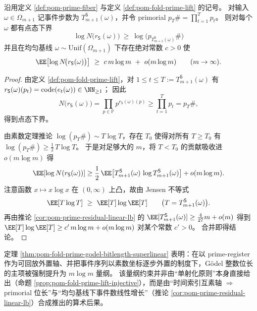 \begin{theorem}\label{thm:pom-fold-prime-godel-bitlength-superlinear}
沿用定义 \ref{def:pom-prime-fiber} 与定义 \ref{def:pom-fold-prime-lift} 的记号。
对输入 \(\omega\in\Omega_{m+1}\) 记事件步数为 \(T_{m+1}^{\mathsf S}(\omega)\)，并令 primorial \(p_T\#=\prod_{t=1}^{T}p_t\)。
则对每个 \(\omega\) 都有点态下界
\[
\boxed{\;
\log N\!\bigl(r_{\mathsf S}(\omega)\bigr)\ \ge\ \log\!\bigl(p_{T_{m+1}^{\mathsf S}(\omega)}\#\bigr)\;}
\]
并且在均匀基线 \(\omega\sim\mathrm{Unif}(\Omega_{m+1})\) 下存在绝对常数 \(c>0\) 使
\[
\EE\!\left[\log N\!\bigl(r_{\mathsf S}(\omega)\bigr)\right]
\ \ge\
c\,m\log m\ +\ o(m\log m)
\qquad(m\to\infty).
\]
\end{theorem}
\begin{proof}
由定义 \ref{def:pom-fold-prime-lift}，对 \(1\le t\le T:=T_{m+1}^{\mathsf S}(\omega)\) 有
\(
r_{\mathsf S}(\omega)(p_t)=\mathrm{code}(e_t(\omega))\in\NN_{\ge 1}
\)；
因此
\[
N\!\bigl(r_{\mathsf S}(\omega)\bigr)
=\prod_{p\in\mathbb{P}}p^{r_{\mathsf S}(\omega)(p)}
\ge \prod_{t=1}^{T} p_t
=p_T\#,
\]
得到点态下界。
\par
由素数定理推论 \(\log(p_T\#)\sim T\log T\)，存在 \(T_0\) 使得对所有 \(T\ge T_0\) 有
\(
\log(p_T\#)\ge \tfrac12\,T\log T
\)。
于是对足够大的 \(m\)，将 \(T<T_0\) 的贡献吸收进 \(o(m\log m)\) 得
\[
\EE\!\left[\log N(r_{\mathsf S}(\omega))\right]
\ge \frac12\,\EE\!\left[T_{m+1}^{\mathsf S}(\omega)\,\log T_{m+1}^{\mathsf S}(\omega)\right]
+o(m\log m).
\]
注意函数 \(x\mapsto x\log x\) 在 \((0,\infty)\) 上凸，故由 Jensen 不等式
\[
\EE[T\log T]\ \ge\ \EE[T]\log\EE[T]
\qquad\bigl(T=T_{m+1}^{\mathsf S}(\omega)\bigr).
\]
再由推论 \ref{cor:pom-prime-residual-linear-lb} 的
\(
\EE[T_{m+1}^{\mathsf S}(\omega)]\ge \frac{4}{27}m+o(m)
\)
得到
\(
\EE[T]\log\EE[T]\ge c'\,m\log m+o(m\log m)
\)
对某个常数 \(c'>0\)。
合并即得结论。
\end{proof}

\begin{remark}\label{rem:pom-replayable-externalization-bitlength}
定理 \ref{thm:pom-fold-prime-godel-bitlength-superlinear} 表明：在以 prime-register 作为可回放外置轴、并把事件序列以素数坐标逐步外置的制度下，Gödel 整数位长的主项被强制提升为 \(m\log m\) 量纲。
该量纲约束并非由“单射化原则”本身直接给出（命题 \ref{prop:pom-fold-prime-lift-injective}），而是由“时间索引互素轴 \(\Rightarrow\) primorial 位长”与“均匀基线下事件数线性增长”（推论 \ref{cor:pom-prime-residual-linear-lb}）合成推出的算术后果。
\end{remark}
